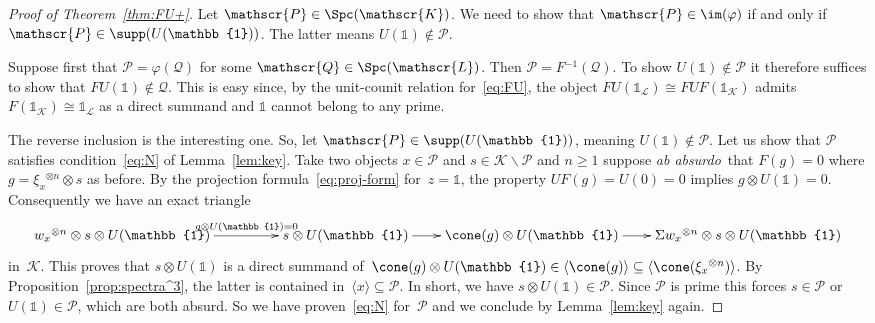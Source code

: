 \documentclass{amsart}
\numberwithin{equation}{section}
\theoremstyle{remark}
\begin{document}
\begin{proof}[Proof of Theorem~\ref{thm:FU+}]
Let ${{\mathscr{{P}}}}\in{\Spc({\mathscr{K}})}$. We need to show that ${{\mathscr{{P}}}}\in\im(\varphi)$ if and only if~${{\mathscr{{P}}}}\in\supp(U({\mathbb{1}}))$. The latter means $U({\mathbb{1}})\notin{{\mathscr{{P}}}}$.

Suppose first that ${{\mathscr{{P}}}}=\varphi({{\mathscr{{Q}}}})$ for some ${{\mathscr{{Q}}}}\in{\Spc({\mathscr{L}})}$. Then ${{\mathscr{{P}}}}=F{^{-1}}({{\mathscr{{Q}}}})$. To show $U({\mathbb{1}})\notin{{\mathscr{{P}}}}$ it therefore suffices to show that $FU({\mathbb{1}})\notin{{\mathscr{{Q}}}}$. This is easy since, by the unit-counit relation for~\eqref{eq:FU}, the object $FU({\mathbb{1}}_{{\mathscr{{L}}}})\cong FUF({\mathbb{1}}_{{\mathscr{{K}}}})$ admits $F({\mathbb{1}}_{{\mathscr{{K}}}})\cong{\mathbb{1}}_{{\mathscr{{L}}}}$ as a direct summand and ${\mathbb{1}}$ cannot belong to any prime.

The reverse inclusion is the interesting one. So, let ${{\mathscr{{P}}}}\in\supp(U({\mathbb{1}}))$, meaning $U({\mathbb{1}})\notin{{\mathscr{{P}}}}$. Let us show that ${{\mathscr{{P}}}}$ satisfies condition~\eqref{eq:N} of Lemma~\ref{lem:key}. Take two objects $x\in{{\mathscr{{P}}}}$ and $s\in{\mathscr{{K}}}{\!\smallsetminus\!}{{\mathscr{{P}}}}$ and $n\ge 1$ suppose {{\sl ab absurdo}}\ that $F(g)=0$ where $g=\xi_x{^{\otimes {n}}}\otimes s$ as before. By the projection formula~\eqref{eq:proj-form} for~$z={\mathbb{1}}$, the property $UF(g)=U(0)=0$ implies $g\otimes U({\mathbb{1}})=0$. Consequently we have an exact triangle
\[
\xymatrix@C=2em{
w_x{^{\otimes {n}}}\otimes s\otimes U({\mathbb{1}}) \ar[rr]^-{g\otimes U({\mathbb{1}})=0}
&& s\otimes U({\mathbb{1}}) \ar[r]
& \cone(g)\otimes U({\mathbb{1}}) \ar[r]
& \Sigma w_x{^{\otimes {n}}}\otimes s\otimes U({\mathbb{1}})
}
\]
in~${\mathscr{{K}}}$. This proves that $s\otimes U({\mathbb{1}})$ is a direct summand of~$\cone(g)\otimes U({\mathbb{1}})\in {\langle {\cone(g)}\rangle} \subseteq{\langle {\cone(\xi_x{^{\otimes {n}}})}\rangle}$. By Proposition~\ref{prop:spectra^3}, the latter is contained in~${\langle {x}\rangle} \subseteq{{\mathscr{{P}}}}$. In short, we have $s\otimes U({\mathbb{1}})\in{{\mathscr{{P}}}}$. Since ${{\mathscr{{P}}}}$ is prime this forces $s\in{{\mathscr{{P}}}}$ or $U({\mathbb{1}})\in{{\mathscr{{P}}}}$, which are both absurd. So we have proven~\eqref{eq:N} for~${{\mathscr{{P}}}}$ and we conclude by Lemma~\ref{lem:key} again.
\end{proof}
\end{document}
